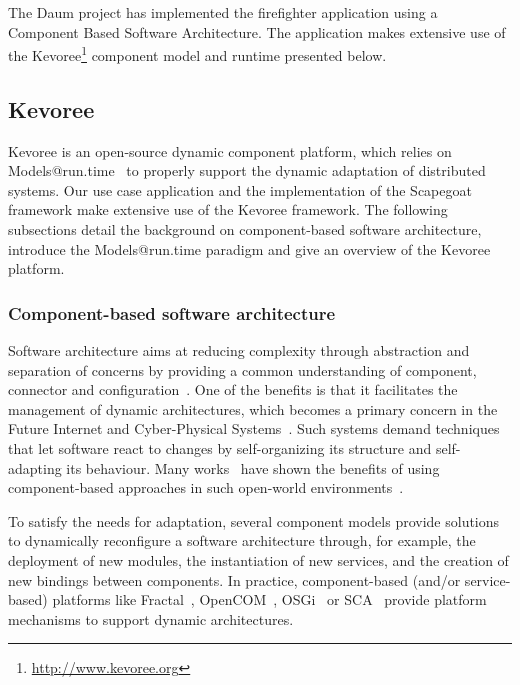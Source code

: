The Daum project has implemented the firefighter application using a Component Based Software Architecture.  The application makes extensive use of the Kevoree\footnote{\url{http://www.kevoree.org}\label{note:kevoree}} component model and runtime presented below.


\subsection{Kevoree}
Kevoree is an open-source dynamic component platform, which relies on Models@run.time~\cite{BlairBF09} to properly support the dynamic adaptation of distributed systems.
Our use case application and the implementation of the Scapegoat framework make extensive use of the Kevoree framework.
The following subsections detail the background on component-based software architecture, introduce the Models@run.time paradigm and give an overview of the Kevoree platform.

\subsubsection{Component-based software architecture}

Software architecture aims at reducing complexity through abstraction and separation of concerns by providing a common understanding of component, connector and configuration~\cite{xadl,Medvidovic:2000,VanOmmering-et-al-00}.
One of the benefits is that it facilitates the management of dynamic architectures, which becomes a primary concern in the Future Internet and Cyber-Physical Systems~\cite{DBLP:journals/ase/NittoGMPP08}.
Such systems demand techniques that let software react to changes by self-organizing its structure and self-adapting its behaviour. Many works~\cite{cbse-conference} have shown the benefits of using component-based approaches in such open-world environments~\cite{baresi2006toward}.

To satisfy the needs for adaptation, several component models provide solutions to dynamically reconfigure a software architecture through, for example, the deployment of new modules, the instantiation of new services, and the creation of new bindings between components. 
In practice, component-based (and/or service-based) platforms like Fractal~\cite{bruneton06}, OpenCOM~\cite{Coulson04acomponent}, OSGi~\cite{OSGI:r5} or SCA~\cite{SEINTURIER:2011:INRIA-00567442:1} provide platform mechanisms to support dynamic architectures.

